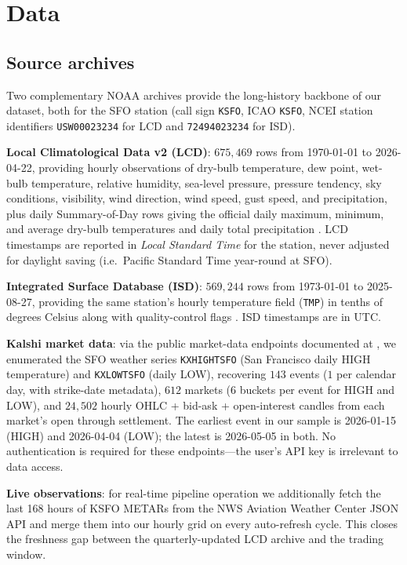 \documentclass[11pt]{article}
\begin{document}
\section{Data}
\label{sec:data}

\subsection{Source archives}

Two complementary NOAA archives provide the long-history backbone of our
dataset, both for the SFO station (call sign \texttt{KSFO}, ICAO
\texttt{KSFO}, NCEI station identifiers \texttt{USW00023234} for LCD and
\texttt{72494023234} for ISD).

\textbf{Local Climatological Data v2 (LCD)}: $675{,}469$ rows from
1970-01-01 to 2026-04-22, providing hourly observations of dry-bulb
temperature, dew point, wet-bulb temperature, relative humidity, sea-level
pressure, pressure tendency, sky conditions, visibility, wind direction,
wind speed, gust speed, and precipitation, plus daily Summary-of-Day rows
giving the official daily maximum, minimum, and average dry-bulb
temperatures and daily total precipitation \citep{noaalcd}. LCD timestamps
are reported in \emph{Local Standard Time} for the station, never adjusted
for daylight saving (i.e.\ Pacific Standard Time year-round at SFO).

\textbf{Integrated Surface Database (ISD)}: $569{,}244$ rows from
1973-01-01 to 2025-08-27, providing the same station's hourly temperature
field (\texttt{TMP}) in tenths of degrees Celsius along with quality-control
flags \citep{noaaisd}. ISD timestamps are in UTC.

\textbf{Kalshi market data}: via the public market-data endpoints documented
at \citet{kalshi_docs}, we enumerated the SFO weather series
\texttt{KXHIGHTSFO} (San Francisco daily HIGH temperature) and
\texttt{KXLOWTSFO} (daily LOW), recovering $143$ events ($1$ per calendar
day, with strike-date metadata), $612$ markets ($6$ buckets per event for
HIGH and LOW), and $24{,}502$ hourly OHLC + bid-ask + open-interest candles
from each market's open through settlement. The earliest event in our
sample is 2026-01-15 (HIGH) and 2026-04-04 (LOW); the latest is 2026-05-05
in both. No authentication is required for these endpoints---the user's
API key is irrelevant to data access.

\textbf{Live observations}: for real-time pipeline operation we additionally
fetch the last 168 hours of KSFO METARs from the NWS Aviation Weather Center
JSON API \citep{nws_metar} and merge them into our hourly grid on every
auto-refresh cycle. This closes the freshness gap between the
quarterly-updated LCD archive and the trading window.
\end{document}
